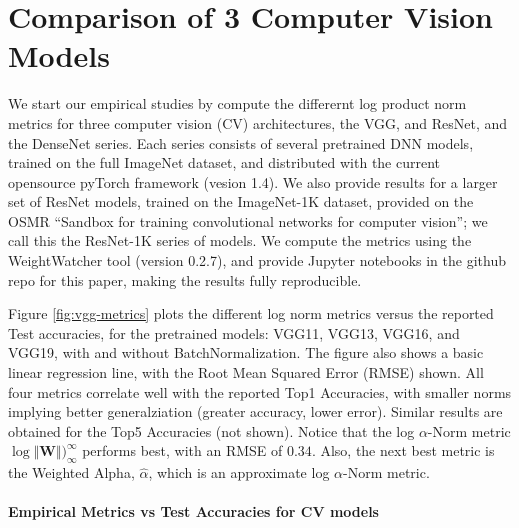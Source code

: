 \section{Comparison of 3 Computer Vision Models}
\label{sxn:cv}


We start our empirical studies by compute the differernt log 
product norm metrics for three computer vision (CV) architectures,
the VGG, and ResNet, and the DenseNet series.  Each
series consists of several pretrained DNN models, 
trained on the full ImageNet\cite{imagenet} dataset,
and distributed with the current opensource pyTorch framework (vesion 1.4)\cite{pyTorch}.
We also provide results for a larger set of ResNet models,
trained on the ImageNet-1K dataset\cite{imagenet1k},  provided 
on the OSMR ``Sandbox for training convolutional networks for computer vision''\cite{osmr};
we call this the ResNet-1K series of models.
We compute the metrics using the WeightWatcher tool (version 0.2.7),
and provide Jupyter notebooks in the github repo for this paper\cite{repo},
making the results fully reproducible.

Figure \ref{fig:vgg-metrics} plots the different log norm metrics
versus the reported Test accuracies\cite{pyTorchVgg}, for the
pretrained models:  VGG11, VGG13, VGG16, and VGG19, with and without
BatchNormalization.  The figure also shows a basic linear regression
line, with the Root Mean Squared Error (RMSE) shown.
All four metrics correlate well with the reported Top1 Accuracies,
with smaller norms implying better generalziation 
(greater accuracy, lower error).  Similar results are obtained
for the Top5 Accuracies (not shown).  Notice that the log $\alpha$-Norm
metric $\log\Vert\mathbf{W}\Vert)_{\infty}^{\infty}$ performs best,
with an RMSE of $0.34$.  Also, the next best metric is the
Weighted Alpha, $\hat\alpha$, which is an approximate log $\alpha$-Norm metric.

\paragraph{Empirical Metrics vs Test Accuracies for CV models}

